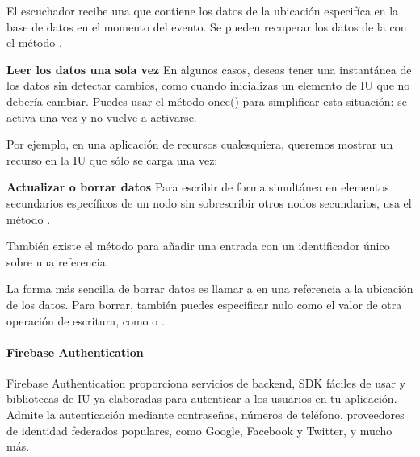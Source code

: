 El escuchador recibe una  que contiene los datos de la ubicación
especifíca en la base de datos en el momento del evento. Se pueden recuperar
los datos de la  con el método .


\textbf{Leer los datos una sola vez}
\label{\detokenize{firebase_web:leer-los-datos-una-sola-vez}}
En algunos casos, deseas tener una instantánea de los datos sin detectar cambios,
como cuando inicializas un elemento de IU que no debería cambiar. Puedes usar
el método once() para simplificar esta situación: se activa una vez y no vuelve
a activarse.

Por ejemplo, en una aplicación de recursos cualesquiera, queremos mostrar un
recurso en la IU que sólo se carga una vez:

%
\begin{sphinxVerbatim}[commandchars=\\\{\}]
 
\end{sphinxVerbatim}


\textbf{Actualizar o borrar datos}
\label{\detokenize{firebase_web:actualizar-o-borrar-datos}}
Para escribir de forma simultánea en elementos secundarios específicos de un
nodo sin sobrescribir otros nodos secundarios, usa el método .

También existe el método  para añadir una entrada con un identificador
único sobre una referencia.

La forma más sencilla de borrar datos es llamar a  en una referencia a
la ubicación de los datos. Para borrar, también puedes especificar nulo como
el valor de otra operación de escritura, como  o .


\paragraph{Firebase Authentication}
\label{\detokenize{firebase_web:firebase-authentication}}
Firebase Authentication proporciona servicios de backend, SDK fáciles de usar y bibliotecas de IU ya elaboradas para autenticar a los usuarios en tu aplicación. Admite la autenticación mediante contraseñas, números de teléfono, proveedores de identidad federados populares, como Google, Facebook y Twitter, y mucho más.



